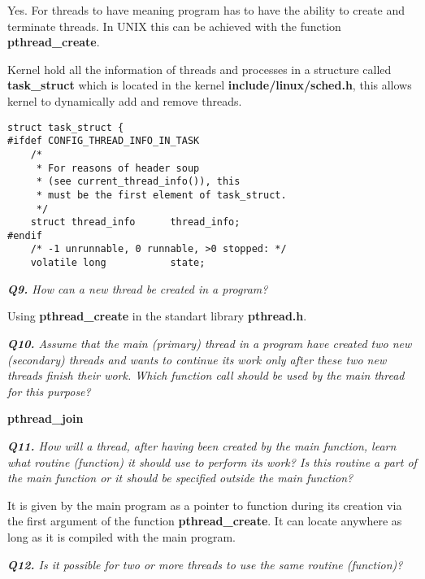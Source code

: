 \documentclass[11pt]{article}
\begin{document}
Yes. For threads to have meaning program has to have the ability to create and terminate threads. In UNIX this can be achieved with the function \textbf{pthread\_create}.

Kernel hold all the information of threads and processes in a structure called \textbf{task\_struct} which is located in the kernel \textbf{include/linux/sched.h}, this allows kernel to dynamically add and remove threads.

\begin{lstlisting}[frame=tlrb]
struct task_struct {
#ifdef CONFIG_THREAD_INFO_IN_TASK
	/*
	 * For reasons of header soup 
	 * (see current_thread_info()), this
	 * must be the first element of task_struct.
	 */
	struct thread_info		thread_info;
#endif
	/* -1 unrunnable, 0 runnable, >0 stopped: */
	volatile long			state;

\end{lstlisting}

\vspace{5mm}
\textit{\textbf{Q9.} How can a new thread be created in a program?}
\vspace{5mm}

Using \textbf{pthread\_create} in the standart library \textbf{pthread.h}.

\vspace{5mm}
\textit{\textbf{Q10.} Assume that the main (primary) thread in a program have created two new (secondary) threads and wants to continue its work only after these two new threads finish their work. Which function call should be used by the main thread for this purpose?}
\vspace{5mm}

\textbf{pthread\_join}

\vspace{5mm}
\textit{\textbf{Q11.} How will a thread, after having been created by the main function, learn what routine (function) it should use to perform its work? Is this routine a part of the main function or it should be specified outside the main function?}
\vspace{5mm}

It is given by the main program as a pointer to function during its creation via the first argument of the function  \textbf{pthread\_create}. It can locate anywhere as long as it is compiled with the main program.

\vspace{5mm}
\textit{\textbf{Q12.} Is it possible for two or more threads to use the same routine (function)?}
\vspace{5mm}
\end{document}
